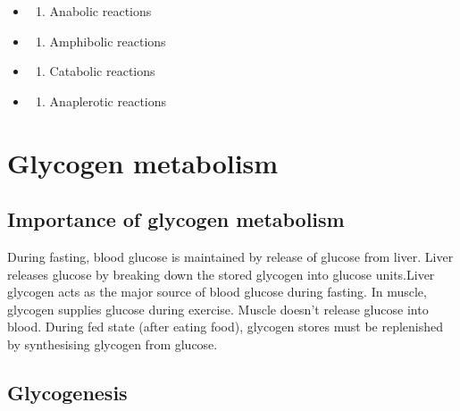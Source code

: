 \documentclass[
]{book}
\providecommand{\tightlist}{%
  \setlength{\itemsep}{0pt}\setlength{\parskip}{0pt}}
\begin{document}
\begin{itemize}
\tightlist
\item
  \begin{enumerate}
  \def\labelenumi{(\Alph{enumi})}
  \tightlist
  \item
    Anabolic reactions\\
  \end{enumerate}
\item
  \begin{enumerate}
  \def\labelenumi{(\Alph{enumi})}
  \setcounter{enumi}{1}
  \tightlist
  \item
    Amphibolic reactions\\
  \end{enumerate}
\item
  \begin{enumerate}
  \def\labelenumi{(\Alph{enumi})}
  \setcounter{enumi}{2}
  \tightlist
  \item
    Catabolic reactions\\
  \end{enumerate}
\item
  \begin{enumerate}
  \def\labelenumi{(\Alph{enumi})}
  \setcounter{enumi}{3}
  \tightlist
  \item
    Anaplerotic reactions
  \end{enumerate}
\end{itemize}

\chapter{Glycogen metabolism}\label{glycogen-metabolism}

\section{Importance of glycogen metabolism}\label{importance-of-glycogen-metabolism}

During fasting, blood glucose is maintained by release of glucose from liver. Liver releases glucose by breaking down the stored glycogen into glucose units.Liver glycogen acts as the major source of blood glucose during fasting. In muscle, glycogen supplies glucose during exercise. Muscle doesn't release glucose into blood. During fed state (after eating food), glycogen stores must be replenished by synthesising glycogen from glucose.

\section{Glycogenesis}\label{glycogenesis}
\end{document}
